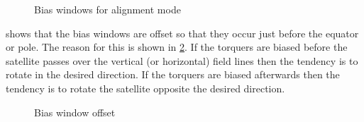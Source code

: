 \begin{figure}[H]
    \centering
    
    \caption{Bias windows for alignment mode}
    \label{fig:windows}
\end{figure}

 shows that the bias windows are offset so that they occur just before the equator or pole. The reason for this is shown in \cref{fig:winplace}. If the torquers are biased before the satellite passes over the vertical (or horizontal) field lines then the tendency is to rotate in the desired direction. If the torquers are biased afterwards then the tendency is to rotate the satellite opposite the desired direction.\cite{Mentch11}

\begin{figure}[htb!]
    \centering
    
    \caption{Bias window offset}
    \label{fig:winplace}
\end{figure}

